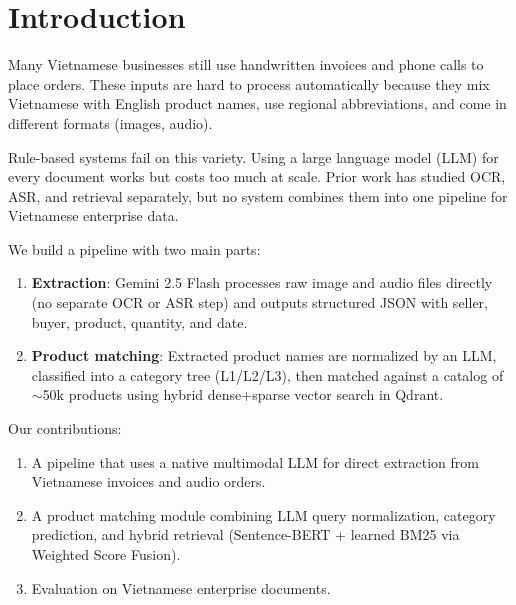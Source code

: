 \section{Introduction}

Many Vietnamese businesses still use handwritten invoices and phone calls to place orders. These inputs are hard to process automatically because they mix Vietnamese with English product names, use regional abbreviations, and come in different formats (images, audio).

Rule-based systems fail on this variety. Using a large language model (LLM) for every document works but costs too much at scale. Prior work has studied OCR, ASR, and retrieval separately, but no system combines them into one pipeline for Vietnamese enterprise data.

We build a pipeline with two main parts:
\begin{enumerate}
    \item \textbf{Extraction}: Gemini 2.5 Flash processes raw image and audio files directly (no separate OCR or ASR step) and outputs structured JSON with seller, buyer, product, quantity, and date.
    \item \textbf{Product matching}: Extracted product names are normalized by an LLM, classified into a category tree (L1/L2/L3), then matched against a catalog of $\sim$50k products using hybrid dense+sparse vector search in Qdrant.
\end{enumerate}

Our contributions:
\begin{enumerate}
    \item A pipeline that uses a native multimodal LLM for direct extraction from Vietnamese invoices and audio orders.
    \item A product matching module combining LLM query normalization, category prediction, and hybrid retrieval (Sentence-BERT + learned BM25 via Weighted Score Fusion).
    \item Evaluation on Vietnamese enterprise documents.
\end{enumerate}